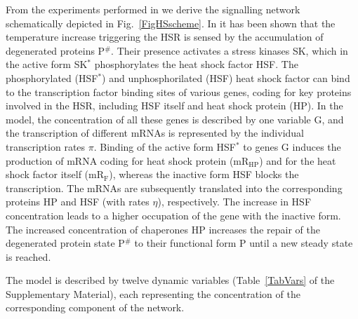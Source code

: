 \documentclass[oneside, 10pt, a4paper, twocolumn]{article}
\begin{document}
From the experiments performed in \cite{Schmollinger2013} we derive
the signalling network schematically depicted in Fig.~\ref{FigHSscheme}. %
In
\cite{Schmollinger2013} it has been shown that the temperature
increase triggering the HSR is sensed by the accumulation of
degenerated proteins P$^\#$. Their presence activates a stress
kinases SK, which in the active form SK$^*$ phosphorylates the heat
shock factor HSF. The phosphorylated (HSF$^*$) and unphosphorilated
(HSF) heat shock factor can bind to the transcription factor binding
sites of various genes, coding for key proteins involved in the HSR,
including HSF itself and heat shock protein (HP). 
In the model, the concentration of all these genes is
described by one variable G, and the transcription of different mRNAs
is represented by the individual transcription rates $\pi$. Binding
of the active form HSF$^*$ to genes G induces the production of mRNA
coding for heat shock protein (mR$_{\text{HP}}$) and for the heat
shock factor itself (mR$_{\text{F}}$), whereas the inactive form HSF
blocks the transcription. The mRNAs are subsequently translated into
the corresponding proteins HP and HSF (with rates $\eta$),
respectively. The increase in HSF concentration leads to a higher
occupation of the gene with the inactive form. The increased
concentration of chaperones HP increases the repair of the
degenerated protein state P$^\#$ to their functional form P until a new
steady state is reached.

The model is described by twelve dynamic variables (Table~\ref{TabVars} of the Supplementary Material), 
each representing the concentration of the corresponding component of the network. 
\end{document}
